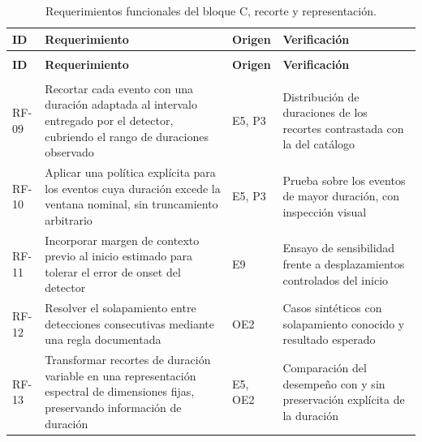 {\small
\begin{longtable}{>{\raggedright\arraybackslash}p{1.2cm}>{\raggedright\arraybackslash}p{4.5cm}>{\raggedright\arraybackslash}p{2.1cm}>{\raggedright\arraybackslash}p{3.7cm}}
\caption{Requerimientos funcionales del bloque C, recorte y representación.}\label{tab:rf-c}\\
\toprule
\textbf{ID} & \textbf{Requerimiento} & \textbf{Origen} & \textbf{Verificación} \\
\midrule
\endfirsthead
\multicolumn{4}{l}{\itshape Cuadro \thetable{} (continuación)}\\
\toprule
\textbf{ID} & \textbf{Requerimiento} & \textbf{Origen} & \textbf{Verificación} \\
\midrule
\endhead
\midrule
\multicolumn{4}{r}{\itshape Continúa en la página siguiente}\\
\endfoot
\bottomrule
\endlastfoot
RF-09 & Recortar cada evento con una duración adaptada al intervalo entregado por
el detector, cubriendo el rango de duraciones observado & E5, P3 &
Distribución de duraciones de los recortes contrastada con la del catálogo \\
\addlinespace
RF-10 & Aplicar una política explícita para los eventos cuya duración excede la
ventana nominal, sin truncamiento arbitrario & E5, P3 &
Prueba sobre los eventos de mayor duración, con inspección visual \\
\addlinespace
RF-11 & Incorporar margen de contexto previo al inicio estimado para tolerar el
error de onset del detector & E9 &
Ensayo de sensibilidad frente a desplazamientos controlados del inicio \\
\addlinespace
RF-12 & Resolver el solapamiento entre detecciones consecutivas mediante una regla
documentada & OE2 &
Casos sintéticos con solapamiento conocido y resultado esperado \\
\addlinespace
RF-13 & Transformar recortes de duración variable en una representación espectral
de dimensiones fijas, preservando información de duración & E5, OE2 &
Comparación del desempeño con y sin preservación explícita de la duración \\
\bottomrule
\end{longtable}
}

